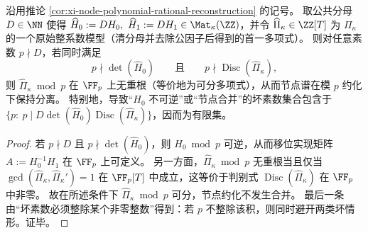 \begin{proposition}\label{prop:xi-node-polynomial-good-reduction-discriminant}
沿用推论 \ref{cor:xi-node-polynomial-rational-reconstruction} 的记号。
取公共分母 \(D\in\NN\) 使得
\(
\widehat H_0:=DH_0,\ \widehat H_1:=DH_1\in \Mat_\kappa(\ZZ)
\)，并令 \(\widehat\Pi_\kappa\in\ZZ[T]\) 为 \(\Pi_\kappa\) 的一个原始整系数模型（清分母并去除公因子后得到的首一多项式）。
则对任意素数 \(p\nmid D\)，若同时满足
\[
p\nmid \det(\widehat H_0)
\qquad\text{且}\qquad
p\nmid \operatorname{Disc}(\widehat\Pi_\kappa),
\]
则 \(\widehat\Pi_\kappa\bmod p\) 在 \(\FF_p\) 上无重根（等价地为可分多项式），从而节点谱在模 \(p\) 约化下保持分离。
特别地，导致“\(H_0\) 不可逆”或“节点合并”的坏素数集合包含于
\(
\{p:\ p\mid D\det(\widehat H_0)\operatorname{Disc}(\widehat\Pi_\kappa)\}
\)，因而为有限集。
\end{proposition}
\begin{proof}
若 \(p\nmid D\) 且 \(p\nmid \det(\widehat H_0)\)，则 \(H_0\bmod p\) 可逆，从而移位实现矩阵 \(A:=H_0^{-1}H_1\) 在 \(\FF_p\) 上可定义。
另一方面，\(\widehat\Pi_\kappa\bmod p\) 无重根当且仅当
\(
\gcd(\widehat\Pi_\kappa,\widehat\Pi_\kappa')=1
\)
在 \(\FF_p[T]\) 中成立，这等价于判别式 \(\operatorname{Disc}(\widehat\Pi_\kappa)\) 在 \(\FF_p\) 中非零。
故在所述条件下 \(\widehat\Pi_\kappa\bmod p\) 可分，节点约化不发生合并。
最后一条由“坏素数必须整除某个非零整数”得到：若 \(p\) 不整除该积，则同时避开两类坏情形。证毕。
\end{proof}

